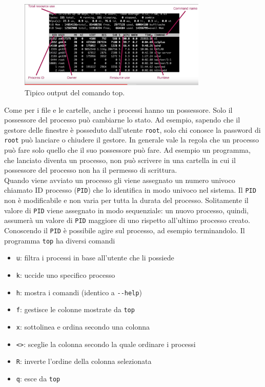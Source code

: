 \begin{figure}
	\centering
	\includegraphics[width=0.8\textwidth]{img/top.png}
	\caption{Tipico output del comando top.}
	\label{top_out}
\end{figure}
Come per i file e le cartelle, anche i processi hanno un possessore. Solo il possessore del processo può cambiarne lo stato. Ad esempio, sapendo che il gestore delle finestre è posseduto dall'utente \verb"root", solo chi conosce la password di \verb"root" può lanciare o chiudere il gestore. In generale vale la regola che un processo può fare solo quello che il suo possessore può fare. Ad esempio un programma, che lanciato diventa un processo, non può scrivere in una cartella in cui il possessore del processo non ha il permesso di scrittura.\\
Quando viene avviato un processo gli viene assegnato un numero univoco chiamato ID processo (\verb"PID") che lo identifica in modo univoco nel sistema.
Il \verb"PID" non è modificabile e non varia per tutta la durata del processo. Solitamente il valore di \verb"PID" viene assegnato in modo sequenziale: un nuovo processo, quindi, assumerà un valore di \verb"PID" maggiore di uno rispetto all'ultimo processo creato.\\
Conoscendo il \verb"PID" è possibile agire sul processo, ad esempio terminandolo.
Il programma \verb"top" ha diversi comandi
\begin{itemize}
	\item \verb*|u|: filtra i processi in base all'utente che li possiede
	\item \verb*|k|: uccide uno specifico processo
	\item \verb*|h|: mostra i comandi (identico a \verb*|--help|)
	\item \verb*|f|: gestisce le colonne mostrate da \verb*|top|
	\item \verb*|x|: sottolinea e ordina secondo una colonna
	\item \verb*|<>|: sceglie la colonna secondo la quale ordinare i processi
	\item \verb*|R|: inverte l'ordine della colonna selezionata
	\item \verb*|q|: esce da \verb*|top|
\end{itemize}

